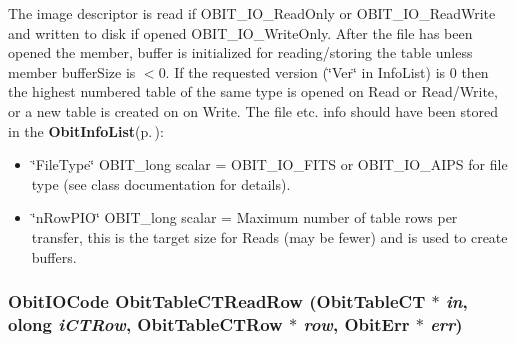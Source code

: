 The image descriptor is read if OBIT\_\-IO\_\-Read\-Only or OBIT\_\-IO\_\-Read\-Write and written to disk if opened OBIT\_\-IO\_\-Write\-Only. After the file has been opened the member, buffer is initialized for reading/storing the table unless member buffer\-Size is $<$0. If the requested version (\char`\"{}Ver\char`\"{} in Info\-List) is 0 then the highest numbered table of the same type is opened on Read or Read/Write, or a new table is created on on Write. The file etc. info should have been stored in the {\bf Obit\-Info\-List}{\rm (p.\,\pageref{structObitInfoList})}: \begin{itemize}
\item \char`\"{}File\-Type\char`\"{} OBIT\_\-long scalar = OBIT\_\-IO\_\-FITS or OBIT\_\-IO\_\-AIPS for file type (see class documentation for details). \item \char`\"{}n\-Row\-PIO\char`\"{} OBIT\_\-long scalar = Maximum number of table rows per transfer, this is the target size for Reads (may be fewer) and is used to create buffers. 
\end{itemize}
\subsubsection{\setlength{\rightskip}{0pt plus 5cm}Obit\-IOCode Obit\-Table\-CTRead\-Row ({\bf Obit\-Table\-CT} $\ast$ {\em in}, {\bf olong} {\em i\-CTRow}, {\bf Obit\-Table\-CTRow} $\ast$ {\em row}, {\bf Obit\-Err} $\ast$ {\em err})}\label{ObitTableCT_8c_a22}


